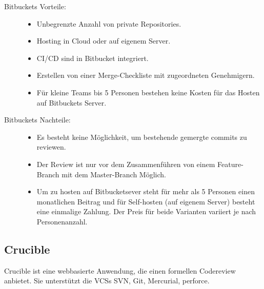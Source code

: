 \begin{description}
	\item [Bitbuckets Vorteile:] \hfill
	\begin{itemize}
		\item Unbegrenzte Anzahl von private Repositories.
		\item Hosting in Cloud oder auf eigenem Server.
		\item \ac{CI}/\ac{CD} sind in Bitbucket integriert.
		\item Erstellen von einer Merge-Checkliste mit zugeordneten Genehmigern.
		\item Für kleine Teams bis 5 Personen bestehen keine Kosten für das Hosten auf Bitbuckets Server.
	\end{itemize}
	
	\item [Bitbuckets Nachteile:] \hfill
	\begin{itemize}
		\item Es besteht keine Möglichkeit, um bestehende gemergte commits zu reviewen.
		\item Der Review ist nur vor dem Zusammenführen von einem Feature-Branch mit dem Master-Branch Möglich.
		\item Um zu hosten auf Bitbucketsever steht für mehr als 5 Personen einen monatlichen Beitrag und für Self-hosten (auf eigenem Server) besteht eine einmalige Zahlung. Der 
			Preis für beide Varianten variiert je nach Personenanzahl.
	\end{itemize}
\end{description}

\subsection{Crucible}
\label{subsec:Crucible}

Crucible ist eine webbasierte Anwendung, die einen formellen Codereview anbietet. Sie unterstützt die \acp{VCS} \ac{SVN}, Git, Mercurial, perforce.

